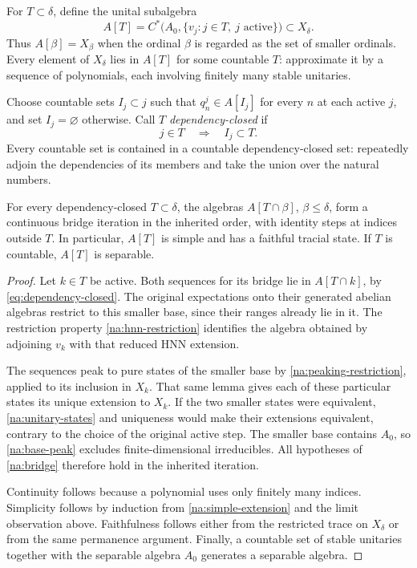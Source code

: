 For $T\subset\delta$, define the unital subalgebra
\[
 A[T]=C^*\bigl(A_0,\{v_j:j\in T,\ j\text{ active}\}\bigr)
 \subset X_\delta.
\]
Thus $A[\beta]=X_\beta$ when the ordinal $\beta$ is regarded as the
set of smaller ordinals. Every element of $X_\delta$ lies in $A[T]$
for some countable $T$: approximate it by a sequence of polynomials,
each involving finitely many stable unitaries.

Choose countable sets $I_j\subset j$ such that
$q_n^j\in A[I_j]$ for every $n$ at each active $j$, and set
$I_j=\varnothing$ otherwise. Call $T$ \emph{dependency-closed} if
\begin{equation}\label{eq:dependency-closed}
 j\in T\quad\Longrightarrow\quad I_j\subset T.
\end{equation}
Every countable set is contained in a countable dependency-closed
set: repeatedly adjoin the dependencies of its members and take the
union over the natural numbers.

\begin{lemma}\label{na:inherited}
For every dependency-closed $T\subset\delta$, the algebras
$A[T\cap\beta]$, $\beta\le\delta$, form a continuous bridge
iteration in the inherited order, with identity steps at indices
outside $T$. In particular, $A[T]$ is simple and has a faithful
tracial state. If $T$ is countable, $A[T]$ is separable.
\end{lemma}
\begin{proof}
Let $k\in T$ be active. Both sequences for its bridge lie in
$A[T\cap k]$, by \eqref{eq:dependency-closed}. The original
expectations onto their generated abelian algebras restrict to this
smaller base, since their ranges already lie in it.
The restriction property \cref{na:hnn-restriction} identifies the
algebra obtained by adjoining $v_k$ with that reduced HNN extension.

The sequences peak to pure states of the smaller base by
\cref{na:peaking-restriction}, applied to its inclusion in $X_k$.
That same lemma gives each of these particular states its unique
extension to $X_k$. If the two smaller states were equivalent,
\cref{na:unitary-states} and uniqueness would make their extensions
equivalent, contrary to the choice of the original active step.
The smaller base contains $A_0$, so \cref{na:base-peak} excludes
finite-dimensional irreducibles. All hypotheses of
\cref{na:bridge} therefore hold in the inherited iteration.

Continuity follows because a polynomial uses only finitely many
indices. Simplicity follows by induction from
\cref{na:simple-extension} and the limit observation above.
Faithfulness follows either from the restricted trace on $X_\delta$
or from the same permanence argument. Finally, a countable set of
stable unitaries together with the separable algebra $A_0$ generates
a separable algebra.
\end{proof}

